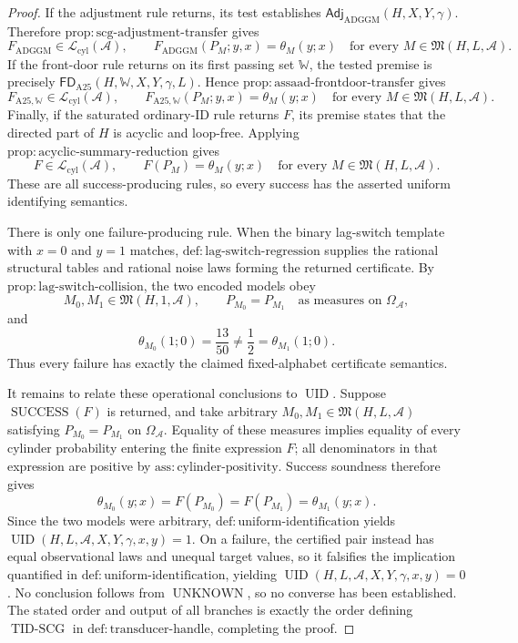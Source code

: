 \documentclass{article}
\begin{document}
\begin{proof}
If the adjustment rule returns, its test establishes \(\mathsf{Adj}_{\mathrm{ADGGM}}(H,X,Y,\gamma)\).  Therefore \(\mathrm{prop:scg\text{-}adjustment\text{-}transfer}\) gives
\[
F_{\mathrm{ADGGM}}\in\mathcal L_{\mathrm{cyl}}(\mathcal A),
\qquad
F_{\mathrm{ADGGM}}(P_M;y,x)=\theta_M(y;x)
\quad
\text{for every }M\in\mathfrak M(H,L,\mathcal A).
\]
If the front-door rule returns on its first passing set \(\mathbb W\), the tested premise is precisely \(\mathsf{FD}_{\mathrm{A25}}(H,\mathbb W,X,Y,\gamma,L)\).  Hence \(\mathrm{prop:assaad\text{-}frontdoor\text{-}transfer}\) gives
\[
F_{\mathrm{A25},\mathbb W}\in\mathcal L_{\mathrm{cyl}}(\mathcal A),
\qquad
F_{\mathrm{A25},\mathbb W}(P_M;y,x)=\theta_M(y;x)
\quad
\text{for every }M\in\mathfrak M(H,L,\mathcal A).
\]
Finally, if the saturated ordinary-ID rule returns \(F\), its premise states that the directed part of \(H\) is acyclic and loop-free.  Applying \(\mathrm{prop:acyclic\text{-}summary\text{-}reduction}\) gives
\[
F\in\mathcal L_{\mathrm{cyl}}(\mathcal A),
\qquad
F(P_M)=\theta_M(y;x)
\quad
\text{for every }M\in\mathfrak M(H,L,\mathcal A).
\]
These are all success-producing rules, so every success has the asserted uniform identifying semantics.

There is only one failure-producing rule.  When the binary lag-switch template with \(x=0\) and \(y=1\) matches, \(\mathrm{def:lag\text{-}switch\text{-}regression}\) supplies the rational structural tables and rational noise laws forming the returned certificate.  By \(\mathrm{prop:lag\text{-}switch\text{-}collision}\), the two encoded models obey
\[
M_0,M_1\in\mathfrak M(H,1,\mathcal A),
\qquad
P_{M_0}=P_{M_1}\quad\text{as measures on }\Omega_{\mathcal A},
\]
and
\[
\theta_{M_0}(1;0)=\frac{13}{50}
\neq\frac12=\theta_{M_1}(1;0).
\]
Thus every failure has exactly the claimed fixed-alphabet certificate semantics.

It remains to relate these operational conclusions to \(\operatorname{UID}\).  Suppose \(\operatorname{SUCCESS}(F)\) is returned, and take arbitrary \(M_0,M_1\in\mathfrak M(H,L,\mathcal A)\) satisfying \(P_{M_0}=P_{M_1}\) on \(\Omega_{\mathcal A}\).  Equality of these measures implies equality of every cylinder probability entering the finite expression \(F\); all denominators in that expression are positive by \(\mathrm{ass:cylinder\text{-}positivity}\).  Success soundness therefore gives
\[
\theta_{M_0}(y;x)=F(P_{M_0})=F(P_{M_1})=\theta_{M_1}(y;x).
\]
Since the two models were arbitrary, \(\mathrm{def:uniform\text{-}identification}\) yields \(\operatorname{UID}(H,L,\mathcal A,X,Y,\gamma,x,y)=1\).  On a failure, the certified pair instead has equal observational laws and unequal target values, so it falsifies the implication quantified in \(\mathrm{def:uniform\text{-}identification}\), yielding \(\operatorname{UID}(H,L,\mathcal A,X,Y,\gamma,x,y)=0\).  No conclusion follows from \(\operatorname{UNKNOWN}\), so no converse has been established.  The stated order and output of all branches is exactly the order defining \(\operatorname{TID\text{-}SCG}\) in \(\mathrm{def:transducer\text{-}handle}\), completing the proof.
\end{proof}
\end{document}
